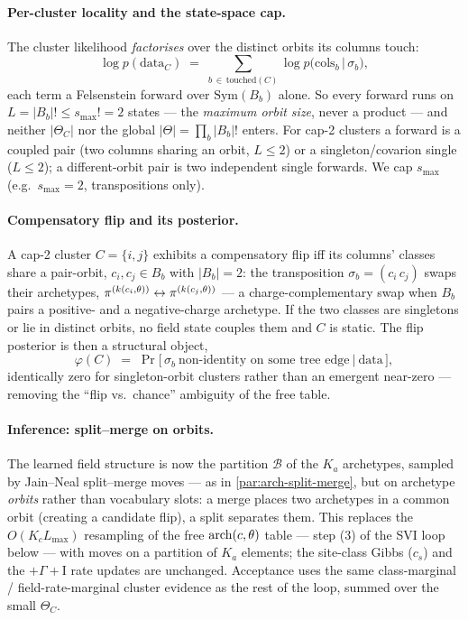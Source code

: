 \paragraph{Per-cluster locality and the state-space cap.} The cluster
likelihood \emph{factorises} over the distinct orbits its columns touch:
\[
  \log p(\text{data}_C) \;=\; \sum_{b\,\in\,\text{touched}(C)}
    \log p\!\big(\text{cols}_b \,\big|\, \sigma_b\big),
\]
each term a Felsenstein forward over $\mathrm{Sym}(B_b)$ alone. So every forward
runs on $L=|B_b|!\le s_{\max}!=2$ states --- the \emph{maximum orbit size},
never a product --- and neither $|\Theta_C|$ nor the global
$|\Theta|=\prod_b|B_b|!$ enters. For cap-2 clusters a forward is a coupled pair
(two columns sharing an orbit, $L\le2$) or a singleton/covarion single
($L\le2$); a different-orbit pair is two independent single forwards. We cap
$s_{\max}$ (e.g.\ $s_{\max}=2$, transpositions only).

\paragraph{Compensatory flip and its posterior.} A cap-2 cluster
$C=\{i,j\}$ exhibits a compensatory flip iff its columns' classes share a
pair-orbit, $c_i,c_j\in B_b$ with $|B_b|=2$: the transposition
$\sigma_b=(c_i\,c_j)$ swaps their archetypes,
$\pi^{(k(c_i,\theta))}\leftrightarrow\pi^{(k(c_j,\theta))}$ --- a
charge-complementary swap when $B_b$ pairs a positive- and a
negative-charge archetype. If the two classes are singletons or lie in
distinct orbits, no field state couples them and $C$ is static. The flip
posterior is then a structural object,
\begin{equation}
  \varphi(C) \;=\; \Pr\!\bigl[\,\sigma_b \ \text{non-identity on some tree
  edge} \ \big|\ \text{data}\,\bigr],
  \label{eq:orbit-flip-posterior}
\end{equation}
identically zero for singleton-orbit clusters rather than an emergent
near-zero --- removing the ``flip vs.\ chance'' ambiguity of the free table.

\paragraph{Inference: split--merge on orbits.} The learned field structure
is now the partition $\mathcal{B}$ of the $K_a$ archetypes, sampled by
Jain--Neal split--merge moves --- as in \autoref{par:arch-split-merge}, but
on archetype \emph{orbits} rather than vocabulary slots: a merge places two
archetypes in a common orbit (creating a candidate flip), a split separates
them. This replaces the $O(K_c L_{\max})$ resampling of the free
$\mathrm{arch}(c,\theta)$ table --- step (3) of the SVI loop below --- with moves on
a partition of $K_a$ elements; the site-class Gibbs ($c_s$) and the
$+\Gamma+\mathrm{I}$ rate updates are unchanged. Acceptance uses the same
class-marginal / field-rate-marginal cluster evidence as the rest of the
loop, summed over the small $\Theta_C$.

